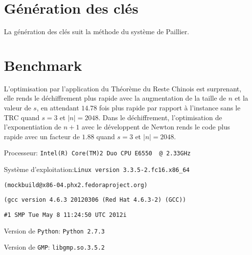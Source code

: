 	\section{Génération des clés}

	La génération des clés suit la méthode du système de Paillier.

	\section{Benchmark}

L'optimisation par l'application du Théorème du Reste Chinois est surprenant,
elle rends le déchiffrement plus rapide avec la augmentation de la taille de $n$ et la valeur de $s$, en attendant 
 $14.78$ fois plus rapide par rapport à l'instance sans le TRC quand $s = 3$ et $|n| = 2048$. 
 Dans le déchiffrement, l'optimisation de l'exponentiation de $n+1$ avec le développent de Newton rends le code plus rapide 
 avec un facteur de $1.88$ quand $s=3$ et $|n|=2048$.

Processeur: \verb!Intel(R) Core(TM)2 Duo CPU E6550  @ 2.33GHz!

Système d'exploitation:\hfill \verb!Linux version 3.3.5-2.fc16.x86_64!

	\hfill		\verb!(mockbuild@x86-04.phx2.fedoraproject.org)!

	\hfill		\verb!(gcc version 4.6.3 20120306 (Red Hat 4.6.3-2) (GCC))!

	\hfill		\verb!#1 SMP Tue May 8 11:24:50 UTC 2012i!

Version de \verb!Python!: \verb!Python 2.7.3!

Version de \verb!GMP!: \verb!libgmp.so.3.5.2!


